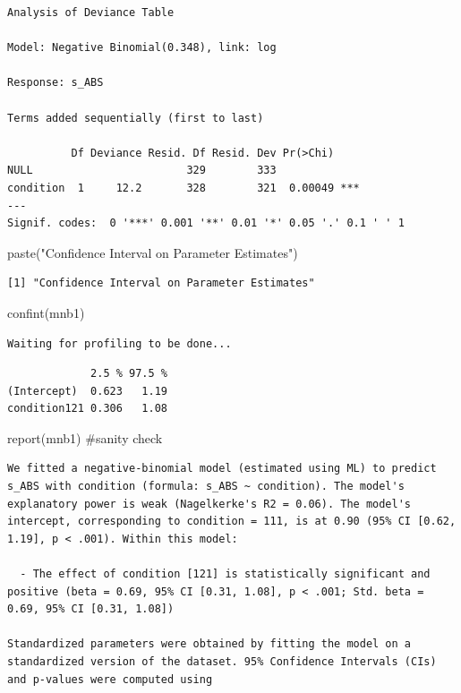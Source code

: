 \documentclass[
  letterpaper,
  DIV=11,
  numbers=noendperiod]{scrreprt}
\newenvironment{Shaded}{\begin{snugshade}}{\end{snugshade}}
\newcommand{\CommentTok}[1]{\textcolor[rgb]{0.37,0.37,0.37}{#1}}
\newcommand{\FunctionTok}[1]{\textcolor[rgb]{0.28,0.35,0.67}{#1}}
\newcommand{\NormalTok}[1]{\textcolor[rgb]{0.00,0.23,0.31}{#1}}
\newcommand{\StringTok}[1]{\textcolor[rgb]{0.13,0.47,0.30}{#1}}
\begin{document}
\begin{verbatim}
Analysis of Deviance Table

Model: Negative Binomial(0.348), link: log

Response: s_ABS

Terms added sequentially (first to last)

          Df Deviance Resid. Df Resid. Dev Pr(>Chi)    
NULL                        329        333             
condition  1     12.2       328        321  0.00049 ***
---
Signif. codes:  0 '***' 0.001 '**' 0.01 '*' 0.05 '.' 0.1 ' ' 1
\end{verbatim}

\begin{Shaded}
\begin{Highlighting}[]
\FunctionTok{paste}\NormalTok{(}\StringTok{"Confidence Interval on Parameter Estimates"}\NormalTok{)}
\end{Highlighting}
\end{Shaded}

\begin{verbatim}
[1] "Confidence Interval on Parameter Estimates"
\end{verbatim}

\begin{Shaded}
\begin{Highlighting}[]
\FunctionTok{confint}\NormalTok{(mnb1)}
\end{Highlighting}
\end{Shaded}

\begin{verbatim}
Waiting for profiling to be done...
\end{verbatim}

\begin{verbatim}
             2.5 % 97.5 %
(Intercept)  0.623   1.19
condition121 0.306   1.08
\end{verbatim}

\begin{Shaded}
\begin{Highlighting}[]
\FunctionTok{report}\NormalTok{(mnb1) }\CommentTok{\#sanity check}
\end{Highlighting}
\end{Shaded}

\begin{verbatim}
We fitted a negative-binomial model (estimated using ML) to predict s_ABS with condition (formula: s_ABS ~ condition). The model's explanatory power is weak (Nagelkerke's R2 = 0.06). The model's intercept, corresponding to condition = 111, is at 0.90 (95% CI [0.62, 1.19], p < .001). Within this model:

  - The effect of condition [121] is statistically significant and positive (beta = 0.69, 95% CI [0.31, 1.08], p < .001; Std. beta = 0.69, 95% CI [0.31, 1.08])

Standardized parameters were obtained by fitting the model on a standardized version of the dataset. 95% Confidence Intervals (CIs) and p-values were computed using 
\end{verbatim}
\end{document}
